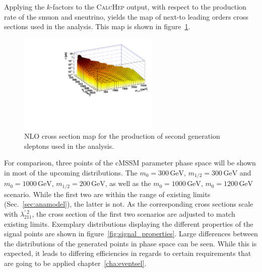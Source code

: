 \noindent Applying the $k$-factors to the \textsc{CalcHep} output, with respect to the production rate of the smuon and sneutrino, yields the map of next-to leading orders cross sections used in the analysis. This map is shown in figure~\ref{fig:susy-2dxs}.

\begin{figure}[!htb]
  \centering
  \includegraphics[width=0.6\textwidth]{plots/2dxs.pdf}
  \caption{NLO cross section map for the production of second generation sleptons used in the analysis.}
  \label{fig:susy-2dxs}
\end{figure}

For comparison, three points of the cMSSM parameter phase space will be shown in most of the upcoming distributions. The $m_0 = 300\,\text{GeV}$, $m_{1/2} = 300\,\text{GeV}$ and $m_0 = 1000\,\text{GeV}$, $m_{1/2} = 200\,\text{GeV}$, as well as the $m_0 = 1000\,\text{GeV}$, $m_0 = 1200\,\text{GeV}$ scenario. While the first two are within the range of existing limits (Sec.~\ref{sec:anamodel}), the latter is not. As the corresponding cross sections scale with $\lambda^{\prime\:2}_{211}$, the cross section of the first two scenarios are adjusted to match existing limits. Exemplary distributions displaying the different properties of the signal points are shown in figure~\ref{fig:signal_properties}. Large differences between the distributions of the generated points in phase space can be seen. While this is expected, it leads to differing efficiencies in regards to certain requirements that are going to be applied chapter~\ref{cha:eventsel}.

